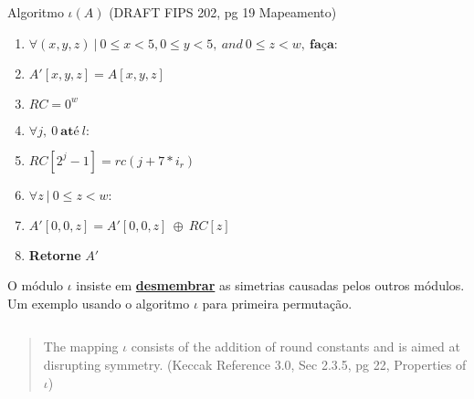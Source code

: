 \documentclass[12pt, a4paper]{article}
\begin{document}
\begin{enumerate}
\begin{enumerate}
Algoritmo $\iota(A)$ (DRAFT FIPS 202, pg 19 Mapeamento)
  \begin{enumerate}
    \item $\forall (x,y,z)\ |\ 0 \le x < 5, 0 \le y < 5,\ and\ 0 \le z < w,\
    \textbf{faça}:$
    \item[] \quad $A'[x, y, z] = A[x, y, z]$
    \item $RC=0^{w}$
    \item $\forall j,\ 0\ \textbf{até}\ l:$
    \item[] \quad $RC[2^{j} - 1] = rc(j+7*i_{r})$
    \item $\forall z\ |\ 0 \le z < w:$
    \item[] \quad $A' [0, 0, z] = A'[0, 0, z]\ \oplus\ RC[z]$
    \item \textbf{Retorne} $A'$\\
  \end{enumerate}

O módulo $\iota$ insiste em \textbf{\underline{desmembrar}} as simetrias
causadas pelos outros módulos.\\

Um exemplo usando o algoritmo $\iota$ para primeira permutação.
\begin{verbatim}

\end{verbatim}

\begin{quotation}
The mapping $\iota$ consists of the addition of round constants and is aimed at
disrupting symmetry. (Keccak Reference 3.0, Sec 2.3.5, pg 22, Properties of
$\iota$)\\
\end{quotation}


\end{enumerate}
\end{enumerate}
\end{document}
